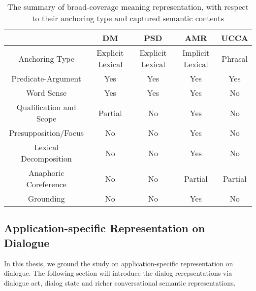 \begin{table}[ht]
  \begin{center}
\setlength{\tabcolsep}{4pt}
{\small
\begin{tabular}{c|cccc}
\toprule
\hline
                        & DM               & PSD              & AMR              & UCCA    \\ \hline
Anchoring Type          & Explicit Lexical & Explicit Lexical & Implicit Lexical & Phrasal \\ \hline
Predicate-Argument      & Yes              & Yes              & Yes              & Yes     \\
Word Sense              & Yes              & Yes              & Yes              & No      \\
Qualification and Scope & Partial          & No               & Yes              & No      \\
Presupposition/Focus    & No               & No               & Yes              & No      \\
Lexical Decomposition   & No               & No               & Yes              & No      \\
Anaphoric Coreference   & No               & No               & Partial          & Partial \\
Grounding               & No               & No               & Yes              & No \\ \hline
\bottomrule

\end{tabular}}
\end{center}
\caption{The summary of broad-coverage meaning representation, with respect to their anchoring type and captured semantic contents}
\label{tbl:summary-broad-coverage}
\end{table}


\subsection{Application-specific Representation on Dialogue}
\label{ssec:bg:dialogue-mr}

In this thesis, we ground the study on application-specific
representation on dialogue. The following section will introduce the
dialog rerepsentations via dialogue act, dialog state and richer
conversational semantic representations.

